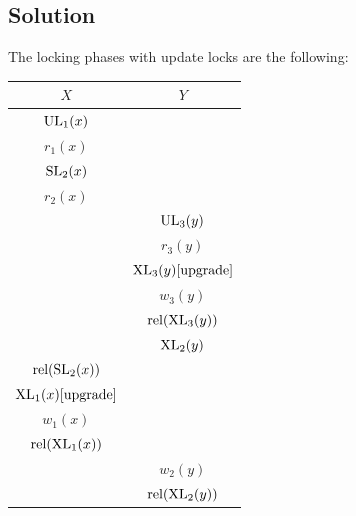 \documentclass[12pt, a4paper]{report}
\begin{document}
    \subsection*{Solution}
        The locking phases with update locks are the following: 
        \begin{table}[H]
            \centering
            \begin{tabular}{|c|c|}
            \hline
            $X$                                           & $Y$                                           \\ \hline
            $\textnormal{UL}_1(x)$                        &                                               \\
            $r_1(x)$                                      &                                               \\
            $\textnormal{SL}_2(x)$                        &                                               \\
            $r_2(x)$                                      &                                               \\
                                                          & $\textnormal{UL}_3(y)$                        \\
                                                          & $r_3(y)$                                      \\
                                                          & $\textnormal{XL}_3(y) [\textnormal{upgrade}]$ \\
                                                          & $w_3(y)$                                      \\
                                                          & $\textnormal{rel}(\textnormal{XL}_3(y))$      \\
                                                          & $\textnormal{XL}_2(y)$                        \\
            $\textnormal{rel}(\textnormal{SL}_2(x))$      &                                               \\
            $\textnormal{XL}_1(x) [\textnormal{upgrade}]$ &                                               \\
            $w_1(x)$                                      &                                               \\
            $\textnormal{rel}(\textnormal{XL}_1(x))$      &                                               \\
                                                          & $w_2(y)$                                      \\
                                                          & $\textnormal{rel}(\textnormal{XL}_2(y))$      \\ \hline
            \end{tabular}
        \end{table}
\end{document}
